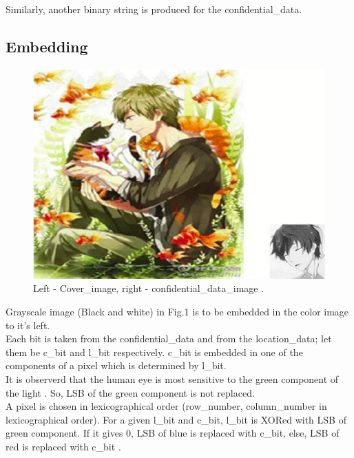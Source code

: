 \documentclass[conference]{IEEEtran}
\begin{document}
Similarly, another binary string is produced for the confidential\_data.\\

\subsection{Embedding}

\begin{figure}[H]
  \includegraphics[width=\linewidth]{cover_image_cum_confidential_data.png}
  \caption{Left - Cover\_image, right - confidential\_data\_image \cite{b2}.}
\end{figure}

Grayscale image (Black and white) in Fig.1 is to be embedded in the color image to it's left.\\

Each bit is taken from the confidential\_data and from the location\_data;
let them be c\_bit and l\_bit respectively.
c\_bit is embedded in one of the components of a pixel which is determined by l\_bit.\\

It is observerd that the human eye is most sensitive to the green component of the light \cite{b2}.
So, LSB of the green component is not replaced.\\

A pixel is chosen in lexicographical order (row\_number, column\_number in lexicographical order).
For a given l\_bit and c\_bit, l\_bit is XORed with LSB of green component.
If it gives 0, LSB of blue is replaced with c\_bit, else, LSB of red is replaced with c\_bit \cite{b2}.\\
\end{document}
